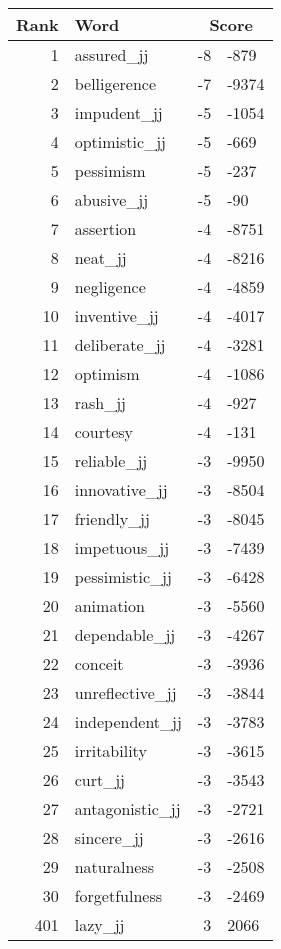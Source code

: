 \begin{longtable}[!htbp]{| rlr@{.}l |}
    \hline
    \textbf{Rank} & \textbf{Word} & \multicolumn{2}{c|}{\textbf{Score}} \\
    \hline
    \endhead
    1 & assured\_jj & -8 & -879 \\
    2 & belligerence & -7 & -9374 \\
    3 & impudent\_jj & -5 & -1054 \\
    4 & optimistic\_jj & -5 & -669 \\
    5 & pessimism & -5 & -237 \\
    6 & abusive\_jj & -5 & -90 \\
    7 & assertion & -4 & -8751 \\
    8 & neat\_jj & -4 & -8216 \\
    9 & negligence & -4 & -4859 \\
    10 & inventive\_jj & -4 & -4017 \\
    11 & deliberate\_jj & -4 & -3281 \\
    12 & optimism & -4 & -1086 \\
    13 & rash\_jj & -4 & -927 \\
    14 & courtesy & -4 & -131 \\
    15 & reliable\_jj & -3 & -9950 \\
    16 & innovative\_jj & -3 & -8504 \\
    17 & friendly\_jj & -3 & -8045 \\
    18 & impetuous\_jj & -3 & -7439 \\
    19 & pessimistic\_jj & -3 & -6428 \\
    20 & animation & -3 & -5560 \\
    21 & dependable\_jj & -3 & -4267 \\
    22 & conceit & -3 & -3936 \\
    23 & unreflective\_jj & -3 & -3844 \\
    24 & independent\_jj & -3 & -3783 \\
    25 & irritability & -3 & -3615 \\
    26 & curt\_jj & -3 & -3543 \\
    27 & antagonistic\_jj & -3 & -2721 \\
    28 & sincere\_jj & -3 & -2616 \\
    29 & naturalness & -3 & -2508 \\
    30 & forgetfulness & -3 & -2469 \\
    401 & lazy\_jj & 3 & 2066 \\

\end{longtable}
